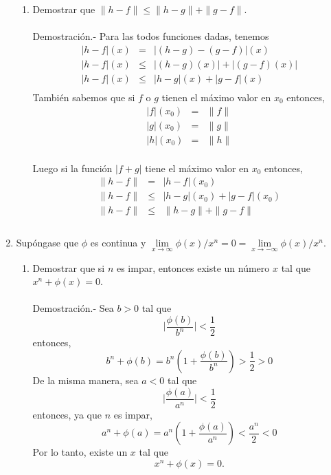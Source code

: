 \begin{enumerate}[\bfseries 1.]
\begin{enumerate}[\bfseries (a)]
	\item Demostrar que $\|h-f\|\leq \|h-g\|+\|g-f\|$.\\\\
	    Demostración.-\; Para las todos funciones dadas, tenemos
	    $$\begin{array}{rcl}
		|h-f|(x)&=&|(h-g)-(g-f)|(x)\\
		|h-f|(x)&\leq&|(h-g)(x)|+|(g-f)(x)|\\
		|h-f|(x)&\leq&|h-g|(x)+|g-f|(x)\\
	    \end{array}$$
	    También sabemos que si $f$ o $g$ tienen el máximo valor en $x_0$ entonces,
	    $$\begin{array}{rcl}
		|f|(x_0)&=&\|f\|\\
		|g|(x_0)&=&\|g\|\\
		|h|(x_0)&=&\|h\|\\
	    \end{array}$$

	    Luego si la función $|f+g|$ tiene el máximo valor en $x_0$ entonces,
	    $$\begin{array}{rcl}
		\|h-f\|&=&|h-f|(x_0)\\
		\|h-f\|&\leq&|h-g|(x_0) + |g-f|(x_0)\\
		       \|h-f\|&\leq&\|h-g\| + \|g-f\|\\\\
	    \end{array}$$

    \end{enumerate}
   
\item Supóngase que $\phi$ es continua y $\lim\limits_{x\to\infty} \phi(x)/x^n = 0 = \lim\limits_{x\to -\infty} \phi (x)/x^n$.

    \begin{enumerate}[\bfseries (a)]

	\item Demostrar que si $n$ es impar, entonces existe un número $x$ tal que $x^n+\phi(x)=0$.\\\\
	    Demostración.-\; Sea $b>0$ tal que $$\bigg|\dfrac{\phi(b)}{b^n}\bigg|<\dfrac{1}{2}$$
	    entonces,
	    $$b^n+\phi(b)=b^n\left(1+\dfrac{\phi(b)}{b^n}\right)>\dfrac{1}{2}>0$$
	    De la misma manera, sea $a<0$ tal que
	    $$\bigg|\dfrac{\phi(a)}{a^n}\bigg|<\dfrac{1}{2}$$
	    entonces, ya que $n$ es impar,
	    $$a^n + \phi(a)=a^n\left(1+\dfrac{\phi(a)}{a^n}\right)<\dfrac{a^n}{2}<0$$
	    Por lo tanto, existe un $x$ tal que 
	    $$x^n + \phi(x)=0.$$\\


\end{enumerate}
\end{enumerate}
